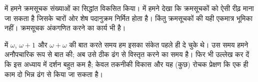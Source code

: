 \documentclass[../../../include/open-logic-section]{subfiles}
\begin{document}


 में हमने क्रमसूचक संख्याओं का सिद्धांत विकसित किया।
 में हमने देखा कि क्रमसूचकों को ऐसी रीढ़ माना जा सकता
है जिसके चारों ओर शेष पदानुक्रम निर्मित होता है। किंतु क्रमसूचकों की यही
एकमात्र भूमिका नहीं। क्रमसूचक अंकगणित करने का कार्य भी है।

 में $\omega$, $\omega+1$ और
$\omega+\omega$ की बात करते समय हम इसका संकेत पहले ही दे चुके थे। उस समय
हमने अनौपचारिक रूप से बात की; अब उसे ठीक ढंग से विस्तृत करने का समय है। फिर
भी उल्लेख कर दें कि इस अध्याय में दर्शन बहुत कम है; केवल तकनीकी विकास और यह
(कुछ) रोचक प्रेक्षण कि एक ही काम दो भिन्न ढंग से किया जा सकता है।
\end{document}
